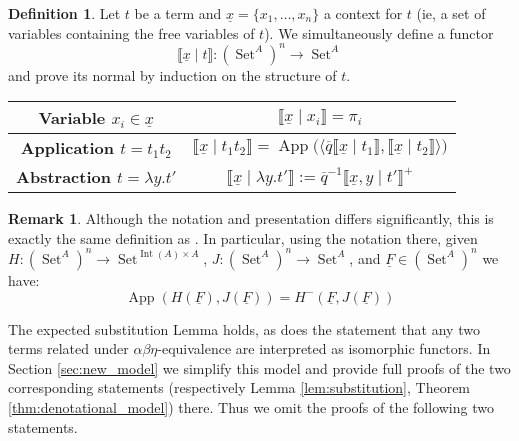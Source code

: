 \documentclass[12pt]{article}
\theoremstyle{plain}
\theoremstyle{definition}
\newtheorem{defn}[thm]{Definition} %
\newtheorem{remark}[thm]{Remark}
\newcommand{\lto}{\longrightarrow}
\DeclareMathOperator{\set}{Set}
\begin{document}
\begin{defn}\label{def:functor_model}
    Let $t$ be a term and $\underline{x} = \{x_1, \ldots, x_n\}$ a context for $t$ (ie, a set of variables containing the free variables of $t$). We simultaneously define a functor
    \begin{equation}
        \llbracket \underline{x} \mid t \rrbracket: (\set^A)^n \lto \set^A
    \end{equation}
    and prove its normal by induction on the structure of $t$.
    \begin{center}
			\begin{tabular}{ | c | c | }
			\hline
				\textbf{Variable $x_i \in \underline{x}$} & 
				$\llbracket \underline{x} \mid x_i \rrbracket = \pi_i$\\
				\hline
\textbf{Application $t = t_1 t_2$} & $\llbracket \underline{x} \mid t_1t_2\rrbracket = \operatorname{App}\big( \langle \overline{q} \llbracket \underline{x} \mid t_1 \rrbracket, \llbracket \underline{x} \mid t_2 \rrbracket \rangle \big)$\\
\hline
\textbf{Abstraction $t = \lambda y. t'$} & $\llbracket \underline{x} \mid \lambda y. t' \rrbracket := \overline{q}^{-1} \llbracket \underline{x}, y \mid t' \rrbracket^+$\\
\hline
			\end{tabular}
		\end{center}
\end{defn}

\begin{remark}
    Although the notation and presentation differs significantly, this is exactly the same definition as \cite[The model $A_\infty$]{Girard}. In particular, using the notation there, given $H: (\set^A)^n \lto \set^{\operatorname{Int}(A) \times A}$, $J: (\set^A)^n \lto \set^A$, and $\underline{F} \in (\set^A)^n$ we have:
    \begin{equation}
        \operatorname{App}(H(\underline{F}), J(\underline{F})) = H^-(\underline{F}, J(\underline{F}))
    \end{equation}
\end{remark}

The expected substitution Lemma holds, as does the statement that any two terms related under $\alpha\beta\eta$-equivalence are interpreted as isomorphic functors. In Section \ref{sec:new_model} we simplify this model and provide full proofs of the two corresponding statements (respectively Lemma \ref{lem:substitution}, Theorem \ref{thm:denotational_model}) there. Thus we omit the proofs of the following two statements.
\end{document}
